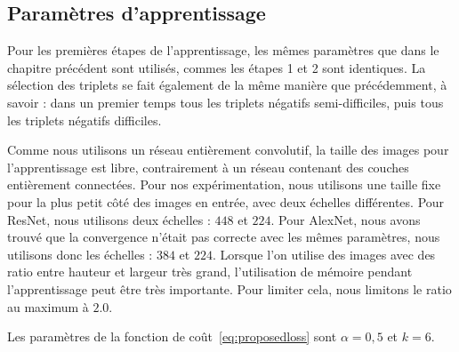 \subsection{Paramètres d'apprentissage}

Pour les premières étapes de l'apprentissage, les mêmes paramètres que dans le chapitre précédent sont utilisés, commes les étapes 1 et 2 sont identiques.
La sélection des triplets se fait également de la même manière que précédemment, à savoir : dans un premier temps tous les triplets négatifs semi-difficiles, puis tous les triplets négatifs difficiles.

Comme nous utilisons un réseau entièrement convolutif, la taille des images pour l'apprentissage est libre, contrairement à un réseau contenant des couches entièrement connectées.
Pour nos expérimentation, nous utilisons une taille fixe pour la plus petit côté des images en entrée, avec deux échelles différentes.
Pour ResNet, nous utilisons deux échelles : $448$ et $224$.
Pour AlexNet, nous avons trouvé que la convergence n'était pas correcte avec les mêmes paramètres, nous utilisons donc les échelles : $384$ et $224$.
Lorsque l'on utilise des images avec des ratio entre hauteur et largeur très grand, l'utilisation de mémoire pendant l'apprentissage peut être très importante. 
Pour limiter cela, nous limitons le ratio au maximum à $2.0$.

Les paramètres de la fonction de coût~\ref{eq:proposedloss} sont $\alpha = 0,5$ et $k=6$.

%



